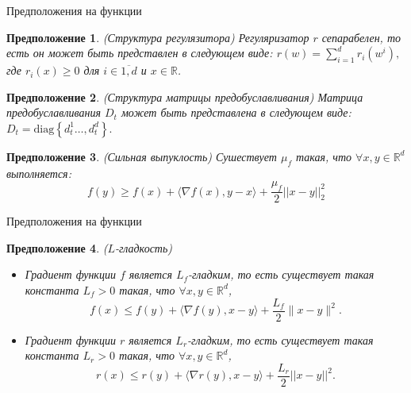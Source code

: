 \documentclass[aspectratio=169, 12pt]{beamer}
\newtheorem{assumption}{Предположение}
\begin{document}
\begin{frame}{Предположения на функции}

\begin{assumption}{(Структура регулязитора)}
    \label{ass:regstruct}
    Регуляризатор $r$ сепарабелен, то есть он может быть представлен в следующем виде:
    $r(w) = \sum_{i=1}^d r_i(w^i),$
    где $r_i(x) \ge 0$ для $i \in \overline{1, d}$ и $x \in \mathbb{R}$.
\end{assumption}

\begin{assumption}{(Структура матрицы предобуславливания)}
    \label{ass:precondstruct}
    Матрица предобуславливания $D_t$ может быть представлена в следующем виде:
     $D_t = \textrm{diag} \left\{ d_t^1 \ldots, d
_t^d \right\}.$
\end{assumption}
\begin{assumption}{(Сильная выпуклость)}
    \label{ass:muconvex}
    Сушествует $\mu_f$ такая, что $\forall x, y \in \mathbb{R}^d$ выполняется:
    $$
    f(y) \geq f(x) + \langle \nabla f(x), y-x \rangle + \frac{\mu_f}{2} ||x-y||_2^2
    $$
\end{assumption}
\end{frame}

\begin{frame}{Предположения на функции}
    \begin{assumption}{($L$-гладкость)} 
\label{ass:smoothness}
\begin{itemize}
    \item 	Градиент функции $f$ является $L_f$-гладким, то есть существует такая константа $L_f > 0$ такая, что $\forall x, y \in \mathbb{R}^d$,
    	\begin{equation*}
    		f(x) \leq f(y) + \langle \nabla f(y), x-y \rangle + \frac{L_f}{2} \|x - y\|^2.
    	\end{equation*}
    \item    Градиент функции $r$ является $L_r$-гладким, то есть существует такая константа $L_r > 0$ такая, что $\forall x, y \in \mathbb{R}^d$,
	\begin{equation*}
		r(x) \leq r(y) + \langle \nabla r(y), x-y \rangle + \frac{L_r}{2} ||x - y||^2.
	\end{equation*}
\end{itemize}
\end{assumption}

\end{frame}
\end{document}
